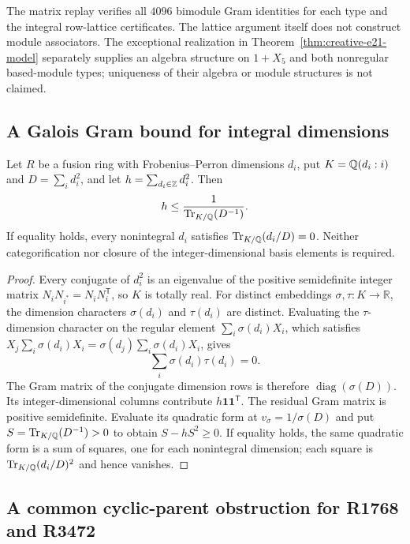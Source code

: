 The matrix replay verifies all $4096$ bimodule Gram identities for
each type and the integral row-lattice certificates. The lattice argument itself does not construct module associators.
The exceptional realization in Theorem~\ref{thm:creative-e21-model}
separately supplies an algebra structure on $1+X_5$ and both
nonregular based-module types; uniqueness of their algebra or module
structures is not claimed.

\subsection{A Galois Gram bound for integral dimensions}
\label{subsec:creative-r3472-gram}

\begin{lemma}
\label{lem:creative-galois-gram}
Let $R$ be a fusion ring with Frobenius--Perron dimensions $d_i$, put
$K=\mathbb Q(d_i:i)$ and $D=\sum_i d_i^2$, and let
$h=\sum_{d_i\in\mathbb Z}d_i^2$. Then
\[
 h\leq \frac1{\operatorname{Tr}_{K/\mathbb Q}(D^{-1})}.
\]
If equality holds, every nonintegral $d_i$ satisfies
$\operatorname{Tr}_{K/\mathbb Q}(d_i/D)=0$.
Neither categorification nor closure of the integer-dimensional basis
elements is required.
\end{lemma}
\begin{proof}
Every conjugate of $d_i^2$ is an eigenvalue of the positive semidefinite
integer matrix $N_iN_{i^*}=N_iN_i^{\mathsf T}$, so $K$ is totally real.
For distinct embeddings $\sigma,\tau:K\longrightarrow\mathbb R$, the
dimension characters $\sigma(d_i)$ and $\tau(d_i)$ are distinct.
Evaluating the $\tau$-dimension character on the regular element
$\sum_i\sigma(d_i)X_i$, which satisfies
$X_j\sum_i\sigma(d_i)X_i=\sigma(d_j)\sum_i\sigma(d_i)X_i$, gives
\[
 \sum_i\sigma(d_i)\tau(d_i)=0.
\]
The Gram matrix of the conjugate dimension rows is therefore
$\operatorname{diag}(\sigma(D))$. Its integer-dimensional columns
contribute $h\mathbf1\mathbf1^{\mathsf T}$. The residual Gram matrix
is positive semidefinite. Evaluate its quadratic form at
$v_\sigma=1/\sigma(D)$ and put
$S=\operatorname{Tr}_{K/\mathbb Q}(D^{-1})>0$ to obtain $S-hS^2\geq0$.
If equality holds, the same quadratic form is a sum of squares, one
for each nonintegral dimension; each square is
$\operatorname{Tr}_{K/\mathbb Q}(d_i/D)^2$ and hence vanishes.
\end{proof}

\subsection{A common cyclic-parent obstruction for R1768 and R3472}
\label{subsec:creative-cyclic-parent}

